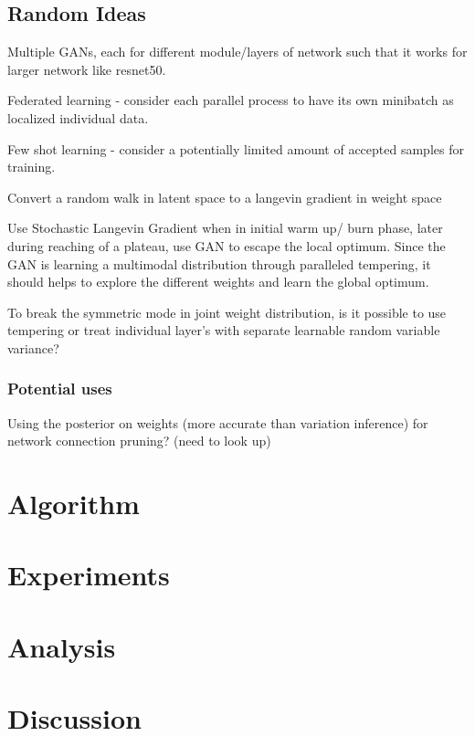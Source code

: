 \documentclass[honours,12pt]{unswthesis}
\numberwithin{equation}{section}
\begin{document}
\section{Random Ideas}
Multiple GANs, each for different module/layers of network such that it works for larger network like resnet50.

Federated learning - consider each parallel process to have its own minibatch as localized individual data.

Few shot learning - consider a potentially limited amount of accepted samples for training. 

Convert a random walk in latent space to a langevin gradient in weight space

Use Stochastic Langevin Gradient when in initial warm up/ burn phase, later during reaching of a plateau, use GAN to escape the local optimum. Since the GAN is learning a multimodal distribution through paralleled tempering, it should helps to explore the different weights and learn the global optimum.

To break the symmetric mode in joint weight distribution, is it possible to use tempering or treat individual layer's with separate learnable random variable variance? 

\subsection{Potential uses}
Using the posterior on weights (more accurate than variation inference) for network connection pruning? (need to look up)

\chapter{Algorithm}\label{meth}




\chapter{Experiments}\label{expe}


\chapter{Analysis}\label{anal}


\chapter{Discussion}\label{disc}
\end{document}
